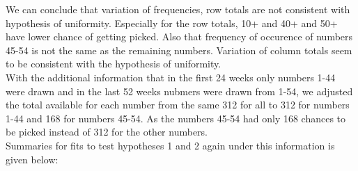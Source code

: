\documentclass{article}
\begin{document}
We can conclude that variation of frequencies, row totals are not consistent with hypothesis of uniformity. Especially for the row totals, 10+ and 40+ and 50+ have lower chance of getting picked. Also that frequency of occurence of numbers 45-54 is not the same as the remaining numbers. Variation of column totals seem to be consistent with the hypothesis of uniformity.\\
With the additional information that in the first 24 weeks only numbers 1-44 were drawn and in the last 52 weeks nubmers were drawn from 1-54, we adjusted the total available for each number from the same 312 for all to 312 for numbers 1-44 and 168 for numbers 45-54. As the numbers 45-54 had only 168 chances to be picked instead of 312 for the other numbers.\\
Summaries for fits to test hypotheses 1 and 2 again under this information is given below:
\end{document}
